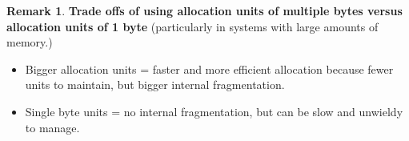 \documentclass[11pt,a4paper]{article}
\theoremstyle{definition}
\newtheorem*{remark}{Remark}
\newenvironment{myitemize}
{ \begin{itemize}
    \setlength{\itemsep}{5pt}
    \setlength{\parskip}{0pt}
    \setlength{\parsep}{0pt}     }
{ \end{itemize}                  }
\begin{document}
\begin{remark}{\textbf{Trade offs of using allocation units of multiple bytes versus allocation units of 1 byte}} (particularly in systems with large amounts of memory.)

	\begin{myitemize}
		\item Bigger allocation units = faster and more efficient allocation because fewer units to maintain, but bigger internal fragmentation.
		\item Single byte units = no internal fragmentation, but can be slow and unwieldy to manage.
	\end{myitemize}
	
\end{remark}














\end{document}
